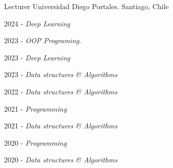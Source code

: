 

\begin{cventries}

  \cventry
    {Lecturer} %
    {Universidad Diego Portales.} %
    {Santiago, Chile} %
    {} %
    {
      \begin{cvitems} %
        \item 2024 - \emph{Deep Learning}
        \item 2023 - \emph{OOP Programing}.
        \item 2023 - \emph{Deep Learning}
        \item 2023 - \emph{Data structures \& Algorithms}
        \item 2022 - \emph{Data structures \& Algorithms}
        \item 2021 - \emph{Programming}
        \item 2021 - \emph{Data structures \& Algorithms}
        \item 2020 - \emph{Programming}
        \item 2020 - \emph{Data structures \& Algorithms}
      \end{cvitems}
    }

\end{cventries}
